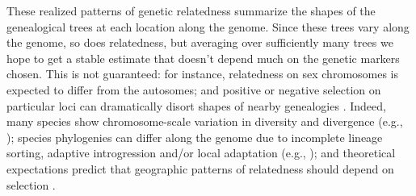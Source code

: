 \documentclass[11pt, oneside]{article}   	%
\newcommand\citet{\cite}
\newcommand\citep{\cite}
\begin{document}

These realized patterns of genetic relatedness
summarize the shapes of the genealogical trees %
at each location along the genome.
Since these trees vary along the genome, so does relatedness,
but averaging over sufficiently many trees we hope to get a stable estimate
that doesn't depend much on the genetic markers chosen.
This is not guaranteed:
for instance,
relatedness on sex chromosomes is expected to differ from the autosomes;
and positive or negative selection on particular loci can dramatically disort shapes of nearby genealogies
\citep{kim2002hitchhiking,charlesworth1993effect,barton2000genetic}.
Indeed,
many species show chromosome-scale variation in diversity and divergence
(e.g., \citep{langley2012genomic});
species phylogenies can differ along the genome 
due to incomplete lineage sorting,
adaptive introgression and/or local adaptation 
(e.g., \citep{pease2013accurate,ellegren2012genomic,nadeau2012genomic,pool2015natural,vernot2014resurrecting});
and theoretical expectations predict that geographic patterns of relatedness should depend on selection
\citep{charlesworth2003review}.
\end{document}

